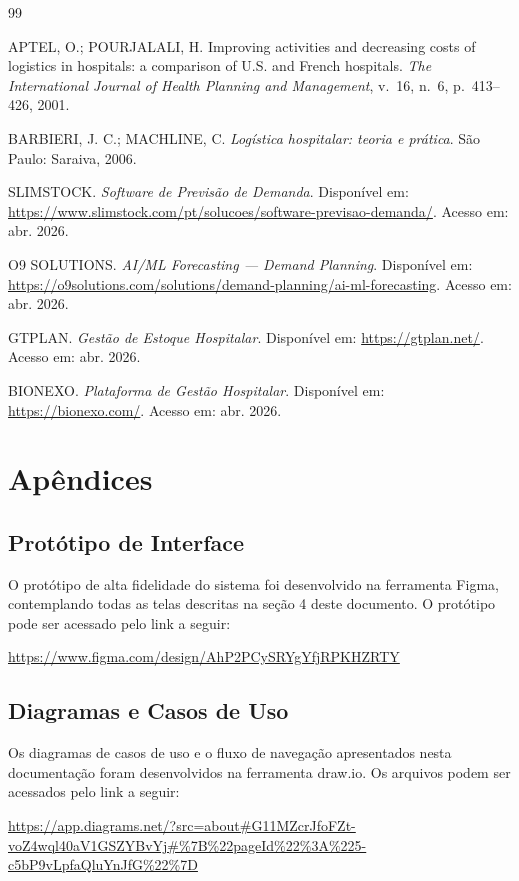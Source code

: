 \documentclass[12pt,a4paper]{article}
\begin{document}
\begin{thebibliography}{99}

    APTEL, O.; POURJALALI, H. Improving activities and decreasing costs of logistics in
    hospitals: a comparison of U.S. and French hospitals. \textit{The International Journal
        of Health Planning and Management}, v.~16, n.~6, p.~413--426, 2001.

    BARBIERI, J. C.; MACHLINE, C. \textit{Logística hospitalar: teoria e prática}.
    São Paulo: Saraiva, 2006.

    SLIMSTOCK. \textit{Software de Previsão de Demanda}. Disponível em:
    \url{https://www.slimstock.com/pt/solucoes/software-previsao-demanda/}.
    Acesso em: abr. 2026.

    O9 SOLUTIONS. \textit{AI/ML Forecasting --- Demand Planning}. Disponível em:
    \url{https://o9solutions.com/solutions/demand-planning/ai-ml-forecasting}.
    Acesso em: abr. 2026.

    GTPLAN. \textit{Gestão de Estoque Hospitalar}. Disponível em:
    \url{https://gtplan.net/}. Acesso em: abr. 2026.

    BIONEXO. \textit{Plataforma de Gestão Hospitalar}. Disponível em:
    \url{https://bionexo.com/}. Acesso em: abr. 2026.

\end{thebibliography}

\section{Apêndices}

\subsection{Protótipo de Interface}
O protótipo de alta fidelidade do sistema foi desenvolvido na ferramenta
Figma, contemplando todas as telas descritas na seção 4 deste documento.
O protótipo pode ser acessado pelo link a seguir:
\begin{center}
    \url{https://www.figma.com/design/AhP2PCySRYgYfjRPKHZRTY}
\end{center}

\subsection{Diagramas e Casos de Uso}
Os diagramas de casos de uso e o fluxo de navegação apresentados nesta
documentação foram desenvolvidos na ferramenta draw.io. Os arquivos podem
ser acessados pelo link a seguir:
\begin{center}
    \url{https://app.diagrams.net/?src=about#G11MZcrJfoFZt-voZ4wql40aV1GSZYBvYj#%7B%22pageId%22%3A%225-c5bP9vLpfaQluYnJfG%22%7D}
\end{center}
\end{document}

